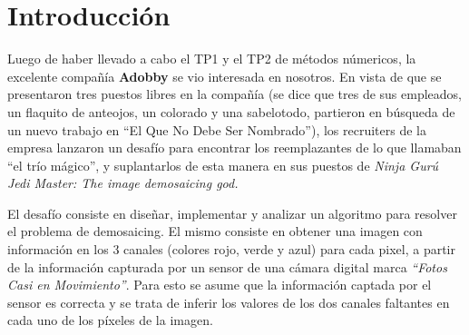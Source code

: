 \hypersetup{
    colorlinks,
    citecolor=black,
    filecolor=black,
    linkcolor=black,
    urlcolor=black
}


\lstset{escapechar=@,style=customc}




\fecha{\today}




\maketitle

\tableofcontents
\newpage

\section*{Introducción}

Luego de haber llevado a cabo el TP1 y el TP2 de métodos númericos, la excelente compañía \textbf{Adobby} se vio interesada en nosotros. En vista de que se presentaron tres puestos libres en la compañía (se dice que tres de sus empleados, un flaquito de anteojos, un colorado y una sabelotodo, partieron en búsqueda de un nuevo trabajo en ``El Que No Debe Ser Nombrado''), los recruiters de la empresa lanzaron un desafío para encontrar los reemplazantes de lo que llamaban ``el trío mágico'', y suplantarlos de esta manera en sus puestos de \textit{Ninja Gurú Jedi Master: The image demosaicing god.}

\vspace{\baselineskip}

El desafío consiste en diseñar, implementar y analizar un algoritmo para resolver el
problema de demosaicing. El mismo consiste en obtener una imagen con información en los 3 canales (colores rojo, verde y azul) para cada pixel, a partir de la información capturada por un sensor de una cámara digital marca \textit{``Fotos Casi en Movimiento''}. Para esto se asume que la información captada por el sensor es
correcta y se trata de inferir los valores de los dos canales faltantes en cada uno de los píxeles de la imagen.

